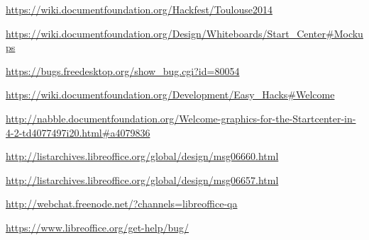 \documentclass{article}
\begin{document}
\begin{thebibliography}{30}
    \url{https://wiki.documentfoundation.org/Hackfest/Toulouse2014}

    \url{https://wiki.documentfoundation.org/Design/Whiteboards/Start_Center#Mockups}

    \url{https://bugs.freedesktop.org/show_bug.cgi?id=80054}

    \url{https://wiki.documentfoundation.org/Development/Easy_Hacks#Welcome}

    \url{http://nabble.documentfoundation.org/Welcome-graphics-for-the-Startcenter-in-4-2-td4077497i20.html#a4079836}

    \url{http://listarchives.libreoffice.org/global/design/msg06660.html}

    \url{http://listarchives.libreoffice.org/global/design/msg06657.html}

    \url{http://webchat.freenode.net/?channels=libreoffice-qa}

    \url{https://www.libreoffice.org/get-help/bug/}

\end{thebibliography}
\end{document}
